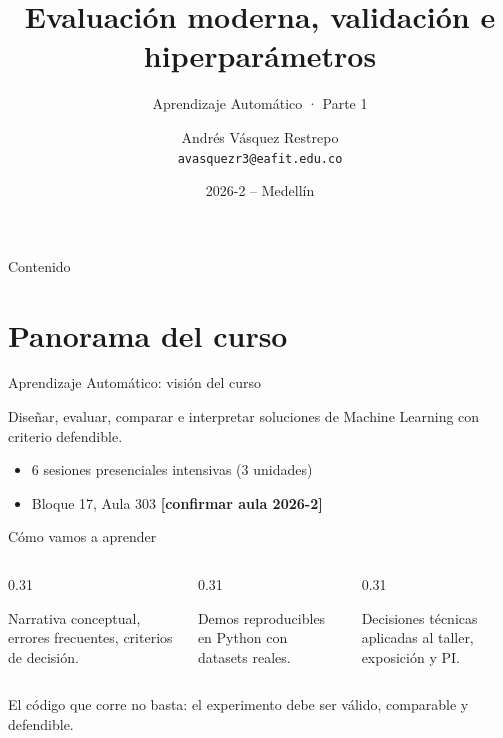 \documentclass[aspectratio=169,12pt]{beamer}
\title[Evaluación, validación e hiperparámetros]{Evaluación moderna, validación e hiperparámetros}
\subtitle{Aprendizaje Automático · Parte 1}
\author[Aprendizaje Automático]{Andrés Vásquez Restrepo\\[2pt]{\normalfont\small\texttt{avasquezr3@eafit.edu.co}}}
\institute{SI7009 - 1 (5553)\\Universidad EAFIT}
\date{2026-2 -- Medellín}
\newcommand{\pend}[1]{\textcolor{mlred}{\textbf{[#1]}}}
\begin{document}
\titleframe
\addtocounter{framenumber}{1}

\begin{frame}{Contenido}
  \tableofcontents
\end{frame}

\section{Panorama del curso}

\begin{frame}{Aprendizaje Automático: visión del curso}
  \large
  \begin{defbox}
    Diseñar, evaluar, comparar e interpretar soluciones de Machine Learning con criterio defendible.
  \end{defbox}
  \begin{itemize}
    \item 6 sesiones presenciales intensivas (3 unidades)
    \item Bloque 17, Aula 303 \pend{confirmar aula 2026-2}
  \end{itemize}
\end{frame}

\begin{frame}{Cómo vamos a aprender}
  \begin{columns}[T]
    \begin{column}{0.31\textwidth}
      \begin{defbox}
        Narrativa conceptual, errores frecuentes, criterios de decisión.
      \end{defbox}
    \end{column}
    \begin{column}{0.31\textwidth}
      \begin{toolbox}[Notebooks]
        Demos reproducibles en Python con datasets reales.
      \end{toolbox}
    \end{column}
    \begin{column}{0.31\textwidth}
      \begin{taskbox}[Práctica]
        Decisiones técnicas aplicadas al taller, exposición y PI.
      \end{taskbox}
    \end{column}
  \end{columns}
  \vspace{6pt}
  \begin{rulebox}
    El código que corre no basta: el experimento debe ser válido, comparable y defendible.
  \end{rulebox}
\end{frame}
\end{document}
